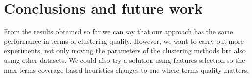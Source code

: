 \documentclass[runningheads]{llncs}
\begin{document}
\section{Conclusions and future work}

From the results obtained so far we can say that our approach
has the same performance in terms of clustering quality.
However, we want to carry out more experiments, not
only moving the parameters of the clustering methods
but also using other datasets. We could also try
a solution using features selection so the max terms coverage based
heuristics changes to one where terms quality matters.




\end{document}

